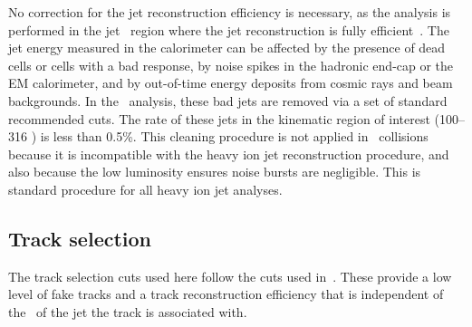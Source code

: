 No correction for the jet reconstruction efficiency is necessary, as the analysis is performed in the jet \pT\ region where the jet reconstruction is fully efficient~\cite{2015392}.
The jet energy measured in the calorimeter can be affected by the presence of dead cells or cells with a bad response, by noise spikes in the hadronic end-cap or the EM calorimeter, and by out-of-time energy deposits from cosmic rays and beam backgrounds.
In the \pp\ analysis, these bad jets are removed via a set of standard recommended cuts.
The rate of these jets in the kinematic region of interest (100--316 \GeV) is less than 0.5\%.
This cleaning procedure is not applied in \PbPb\ collisions because it is incompatible with the heavy ion jet reconstruction procedure, and also because the low luminosity ensures noise bursts are negligible.
This is standard procedure for all heavy ion jet analyses.


\subsection{Track selection}
\label{sec:trackselection}

The track selection cuts used here follow the cuts used in~\cite{PhysRevC.98.024908}.
These provide a low level of fake tracks and a track reconstruction efficiency that is independent of the \pt\ of the jet the track is associated with.

